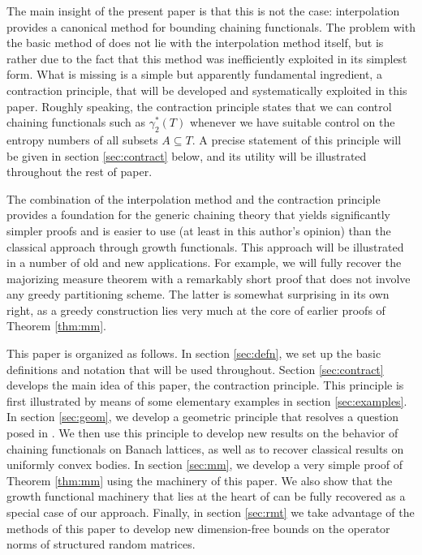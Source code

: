 \documentclass[10pt,reqno]{amsart}
\theoremstyle{definition}
\numberwithin{equation}{section}
\numberwithin{figure}{section}
\numberwithin{table}{section}
\begin{document}
The main insight of the present paper is that this is not the case: 
interpolation provides a canonical method for bounding 
chaining functionals. The problem with the basic method of \cite{vH16a} 
does not lie with the interpolation method itself, but is rather due to 
the fact that this method was inefficiently exploited in its simplest 
form. What is missing is a simple but apparently fundamental ingredient, a 
contraction principle, that will be developed and systematically exploited 
in this paper. Roughly speaking, the contraction principle states that we 
can control chaining functionals such as $\gamma_2^*(T)$ whenever we have 
suitable control on the entropy numbers of all subsets $A\subseteq T$. A 
precise statement of this principle will be given in section 
\ref{sec:contract} below, and its utility will be illustrated throughout 
the rest of paper.

The combination of the interpolation method and the contraction principle 
provides a foundation for the generic chaining theory that yields 
significantly simpler proofs and is easier to use (at least in this 
author's opinion) than the classical approach through growth functionals. 
This approach will be illustrated in a number of old and new applications. 
For example, we will fully recover the majorizing measure theorem with a 
remarkably short proof that does not involve any greedy partitioning 
scheme. The latter is somewhat surprising in its own right, as a greedy 
construction lies very much at the core of earlier proofs of Theorem 
\ref{thm:mm}.

This paper is organized as follows. In section \ref{sec:defn}, we set up 
the basic definitions and notation that will be used throughout. Section 
\ref{sec:contract} develops the main idea of this paper, the contraction 
principle. This principle is first illustrated by means of some elementary 
examples in section \ref{sec:examples}. In section \ref{sec:geom}, we 
develop a geometric principle that resolves a question posed in 
\cite[Remark 4.4]{vH16a}. We then use this principle to develop new 
results on the behavior of chaining functionals on Banach lattices, as 
well as to recover classical results on uniformly convex bodies. In 
section \ref{sec:mm}, we develop a very simple proof of Theorem 
\ref{thm:mm} using the machinery of this paper. We also show that the 
growth functional machinery that lies at the heart of \cite{Tal14} can be 
fully recovered as a special case of our approach. Finally, in section 
\ref{sec:rmt} we take advantage of the methods of this paper to
develop new dimension-free bounds on the operator norms of structured 
random matrices.
\end{document}
